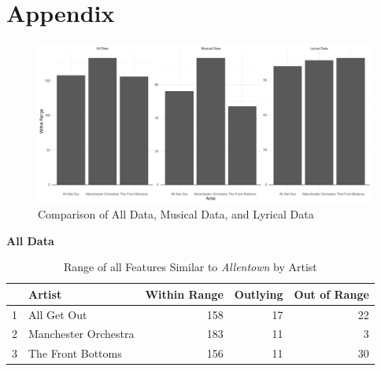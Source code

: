 \documentclass{article}\usepackage[]{graphicx}\usepackage[]{xcolor}
\makeatletter
\def\maxwidth{ %
  \ifdim\Gin@nat@width>\linewidth
    \linewidth
  \else
    \Gin@nat@width
  \fi
}
\newenvironment{knitrout}{}{} %
\makeatother
\begin{document}
\begin{multicols}{2}

\vspace{2em}


\begin{tiny}

\end{tiny}
\end{multicols}
\onecolumn

\section*{Appendix}







\begin{figure}[H]
\begin{center}
\begin{knitrout}
\color{fgcolor}
\includegraphics[width=\maxwidth]{figure/unnamed-chunk-3-1} 
\end{knitrout}
\caption*{Comparison of All Data, Musical Data, and Lyrical Data}
\label{Graph}
\end{center}
\end{figure}

\begin{table}[H]
\begin{center}
\caption*{\textbf{All Data}}
\begin{tabular}{rlrrr}
  \hline
 & Artist & Within Range & Outlying & Out of Range \\ 
  \hline
  1 & All Get Out & 158 & 17 & 22 \\ 
  2 & Manchester Orchestra & 183 & 11 & 3 \\ 
  3 & The Front Bottoms & 156 & 11 & 30 \\ 
   \hline
\end{tabular}
\caption*{Range of all Features Similar to \emph{Allentown} by Artist}
\end{center}
\label{AllTable}
\end{table}
\end{document}
